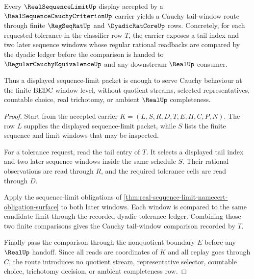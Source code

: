 \begin{theorem}
\label{thm:real-sequence-cauchy-criterion-limit-cauchy-handoff}
Every $\RealSequenceLimitUp$ display accepted by a $\RealSequenceCauchyCriterionUp$ carrier yields a Cauchy tail-window route through finite $\RegSeqRatUp$ and $\DyadicRatCoreUp$ rows. Concretely, for each requested tolerance in the classifier row $T$, the carrier exposes a tail index and two later sequence windows whose regular rational readbacks are compared by the dyadic ledger before the comparison is handed to $\RegularCauchyEquivalenceUp$ and any downstream $\RealUp$ consumer.

Thus a displayed sequence-limit packet is enough to serve Cauchy behaviour at the finite BEDC window level, without quotient streams, selected representatives, countable choice, real trichotomy, or ambient $\RealUp$ completeness.
\end{theorem}
\begin{proof}
Start from the accepted carrier $K=(L,S,R,D,T,E,H,C,P,N)$. The row $L$ supplies the displayed sequence-limit packet, while $S$ lists the finite sequence and limit windows that may be inspected.

For a tolerance request, read the tail entry of $T$. It selects a displayed tail index and two later sequence windows inside the same schedule $S$. Their rational observations are read through $R$, and the required tolerance cells are read through $D$.

Apply the sequence-limit obligations of \autoref{thm:real-sequence-limit-namecert-obligation-surface} to both later windows. Each window is compared to the same candidate limit through the recorded dyadic tolerance ledger. Combining those two finite comparisons gives the Cauchy tail-window comparison recorded by $T$.

Finally pass the comparison through the nonquotient boundary $E$ before any $\RealUp$ handoff. Since all reads are coordinates of $K$ and all replay goes through $C$, the route introduces no quotient stream, representative selector, countable choice, trichotomy decision, or ambient completeness row.
\end{proof}

